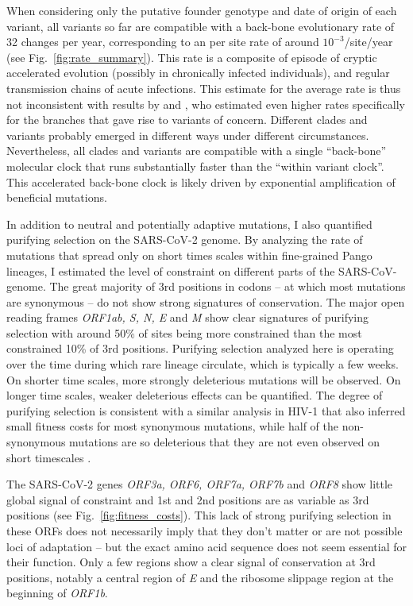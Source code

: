 \documentclass[aps,rmp, twocolumn]{revtex4}
\begin{document}
When considering only the putative founder genotype and date of origin of each variant, all variants so far are compatible with a back-bone evolutionary rate of 32 changes per year, corresponding to an per site rate of around $10^{-3}$/site/year (see Fig.~\ref{fig:rate_summary}).
This rate is a composite of episode of cryptic accelerated evolution (possibly in chronically infected individuals), and regular transmission chains of acute infections.
This estimate for the average rate is thus not inconsistent with results by \citet{hill_origins_2022} and \citet{tay_emergence_2022}, who estimated even higher rates specifically for the branches that gave rise to variants of concern.
Different clades and variants probably emerged in different ways under different circumstances.
Nevertheless, all clades and variants are compatible with a single ``back-bone'' molecular clock that runs substantially faster than the ``within variant clock''.
This accelerated back-bone clock is likely driven by exponential amplification of beneficial mutations.

In addition to neutral and potentially adaptive mutations, I also quantified purifying selection on the SARS-CoV-2 genome.
By analyzing the rate of mutations that spread only on short times scales within fine-grained Pango lineages, I estimated the level of constraint on different parts of the SARS-CoV-genome.
The great majority of 3rd positions in codons -- at which most mutations are synonymous -- do not show strong signatures of conservation.
The major open reading frames \emph{ORF1ab, S, N, E} and \emph{M} show clear signatures of purifying selection with around 50\% of sites being more constrained than the most constrained 10\% of 3rd positions.
Purifying selection analyzed here is operating over the time during which rare lineage circulate, which is typically a few weeks.
On shorter time scales, more strongly deleterious mutations will be observed.
On longer time scales, weaker deleterious effects can be quantified.
The degree of purifying selection is consistent with a similar analysis in HIV-1 that also inferred small fitness costs for most synonymous mutations, while half of the non-synonymous mutations are so deleterious that they are not even observed on short timescales \citep{zanini_vivo_2017}.

The SARS-CoV-2 genes \emph{ORF3a, ORF6, ORF7a, ORF7b} and \emph{ORF8} show little global signal of constraint and 1st and 2nd positions are as variable as 3rd positions (see Fig.~\ref{fig:fitness_costs}).
This lack of strong purifying selection in these ORFs does not necessarily imply that they don't matter or are not possible loci of adaptation -- but the exact amino acid sequence does not seem essential for their function.
Only a few regions show a clear signal of conservation at 3rd positions, notably a central region of \emph{E} and the ribosome slippage region at the beginning of \emph{ORF1b}.
\end{document}
